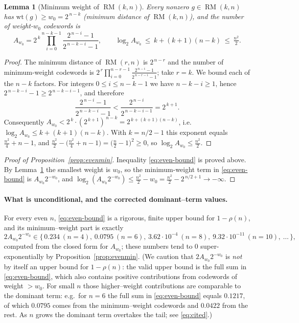 \documentclass{amsart}
\newtheorem{lemma}[theorem]{Lemma}
\theoremstyle{definition}
\DeclareMathOperator{\RM}{RM}
\begin{document}
\begin{lemma}[Minimum weight of $\RM(k,n)$]\label{lem:minw}
Every nonzero $g\in\RM(k,n)$ has $\mathrm{wt}(g)\ge w_0=2^{\,n-k}$
(minimum distance of $\RM(k,n)$), and the number of weight-$w_0$ codewords
is
\[
A_{w_0}=2^{\,k}\prod_{i=0}^{n-k-1}\frac{2^{\,n-i}-1}{2^{\,n-k-i}-1},
\qquad \log_2 A_{w_0}\ \le\ k+(k+1)(n-k)\ \le\ \tfrac{n^2}{2}.
\]
\end{lemma}
\begin{proof}
The minimum distance of $\RM(r,n)$ is $2^{\,n-r}$ and the number of
minimum-weight codewords is
$2^{\,r}\prod_{i=0}^{n-r-1}\frac{2^{\,n-i}-1}{2^{\,n-r-i}-1}$; take $r=k$.
We bound each of the $n-k$ factors. For integers $0\le i\le n-k-1$ we have
$n-k-i\ge1$, hence $2^{\,n-k-i}-1\ge 2^{\,n-k-i-1}$, and therefore
\[
\frac{2^{\,n-i}-1}{2^{\,n-k-i}-1}
<\frac{2^{\,n-i}}{2^{\,n-k-i-1}}=2^{\,k+1}.
\]
Consequently $A_{w_0}<2^{\,k}\cdot(2^{\,k+1})^{\,n-k}
=2^{\,k+(k+1)(n-k)}$, i.e. $\log_2 A_{w_0}\le k+(k+1)(n-k)$. With
$k=n/2-1$ this exponent equals $\tfrac{n^2}{4}+n-1$, and
$\tfrac{n^2}{2}-\bigl(\tfrac{n^2}{4}+n-1\bigr)=\bigl(\tfrac n2-1\bigr)^2\ge0$,
so $\log_2 A_{w_0}\le\tfrac{n^2}{2}$.
\end{proof}

\begin{proof}[Proof of Proposition~\ref{prop:evenmin}]
Inequality \eqref{eq:even-bound} is proved above. By Lemma~\ref{lem:minw}
the smallest weight is $w_0$, so the minimum-weight term in
\eqref{eq:even-bound} is $A_{w_0}2^{-w_0}$, and
$\log_2(A_{w_0}2^{-w_0})\le\frac{n^2}{2}-w_0=\frac{n^2}{2}-2^{\,n/2+1}\to
-\infty$.
\end{proof}

\paragraph{What is unconditional, and the corrected dominant--term values.}
For every even $n$, \eqref{eq:even-bound} is a rigorous, finite upper bound
for $1-\rho(n)$, and its minimum--weight part is exactly
\[
2A_{w_0}2^{-w_0}\in\{\,0.234\ (n=4),\ 0.0795\ (n=6),\
3.62\cdot10^{-4}\ (n=8),\ 9.32\cdot10^{-11}\ (n=10),\ \dots\,\},
\]
computed from the closed form for $A_{w_0}$; these numbers tend to $0$
super-exponentially by Proposition~\ref{prop:evenmin}. (We caution that
$2A_{w_0}2^{-w_0}$ is \emph{not} by itself an upper bound for $1-\rho(n)$:
the valid upper bound is the full sum in \eqref{eq:even-bound}, which also
contains positive contributions from codewords of weight $>w_0$. For
small $n$ those higher--weight contributions are comparable to the
dominant term: e.g.\ for $n=6$ the full sum in \eqref{eq:even-bound}
equals $0.1217$, of which $0.0795$ comes from the minimum--weight
codewords and $0.0422$ from the rest. As $n$ grows the dominant term
overtakes the tail; see \eqref{eq:cited}.)
\end{document}
